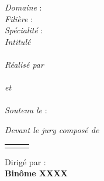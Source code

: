 {\begin{titlepage}
		{\large \textit{Domaine} : \bfseries {\@domaine}}\\
		{\large \textit{Filière} : \bfseries {\@filiere}}\\
		{\large \textit{Spécialité} : \bfseries{\@specialite}}\\
		\vspace{0.5cm}
		\textit{Intitulé}\\
		\vspace{0.25cm}
		{\Huge \color[RGB]{18,96,149} \bfseries{\@title}} \\
		\vfill
		\vspace{0.3cm}
		\textit{Réalisé par}\\
		\vspace{0.125cm}
		{\Large {\bfseries \@author}} \\
		\vspace{0.125cm}
		\textit{et}\\
		\vspace{0.125cm}
		{\Large {\bfseries \@helper}} \\
		\vspace{0.5cm}
		\textit{Soutenu le} : {\bfseries \@date} \\
		\vfill
		\vspace{0.25cm}
		
		\large \textit{Devant le jury composé de\\}
		\vspace{0.25cm}
		\begin{tabular}{>{\bfseries}llr}
			
			\@jurya
			\@juryb
		\end{tabular}
		\vfill
		\vspace{0.5cm}
		Dirigé par : {\bfseries \@directeur}\\
		\vfill
		\vspace{0.25cm}
		\textbf{Binôme \No XXXX}
		
	\end{titlepage}
	\restoregeometry  
}
\makeatother